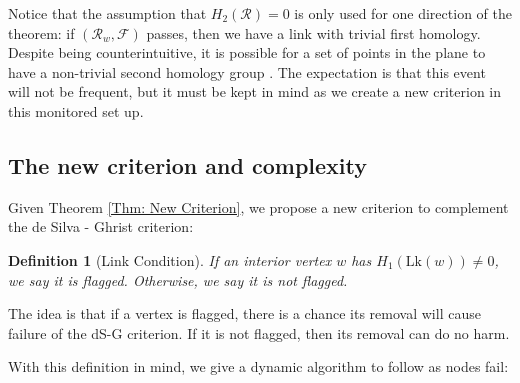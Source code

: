 \documentclass[10pt,twocolumn]{article} \usepackage{amsmath,epsf,amssymb,cite,pifont,amsthm, mathrsfs,epsfig,  bbm, amsthm,  setspace}
\newtheorem{defn}{Definition}
\newcommand{\FF}{\mathcal F}
\newcommand{\RR}{\mathcal R}
\renewcommand{\1}{\mathbbm{1}}
\newcommand{\Lk}{\textrm{Lk}}
\begin{document}
Notice that the assumption that $H_2(\RR)=0$ is only used  for one direction of the theorem: if $(\RR_w,\FF)$ passes, then we have a link with trivial first homology.
Despite being counterintuitive, it is possible for a set of points in the plane to have a non-trivial second homology group \cite{Chambers2009}.
The expectation is that this event will not be frequent, but it must be kept in mind as we create a new criterion in this monitored set up.


\subsection{The new criterion and complexity}

Given Theorem \ref{Thm: New Criterion}, we propose a new criterion to complement the de Silva - Ghrist criterion:
\begin{defn}[Link Condition]
 If an interior vertex $w$ has $H_1(\Lk(w))\neq 0$, we say it is flagged.  Otherwise, we say it is not flagged.
\end{defn}
The idea is that if a vertex is flagged, there is a chance its removal will cause failure of the dS-G criterion.  If it is not flagged, then its removal can do no harm.

With this definition in mind, we give a dynamic algorithm to follow as nodes fail:
\end{document}
